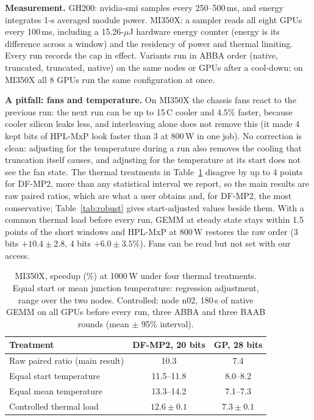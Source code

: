 \documentclass[conference]{IEEEtran}
\newcommand{\W}{\,W}
\newcommand{\pct}{\%}
\begin{document}
\textbf{Measurement.} GH200: nvidia-smi samples every 250--500\,ms, and energy integrates 1-s averaged module power.
MI350X: a sampler reads all eight GPUs every 100\,ms, including a 15.26-$\mu$J hardware energy counter (energy is its
difference across a window) and the residency of power and thermal limiting. Every run records the cap in effect.
Variants run in ABBA order (native, truncated, truncated, native) on the same nodes or GPUs after a cool-down; on MI350X all 8 GPUs run the same configuration
at once.

\textbf{A pitfall: fans and temperature.} On MI350X the chassis fans react to the previous run: the next run can be up
to 15\,\textdegree C cooler and 4.5\pct{} faster, because cooler silicon leaks less, and interleaving alone does not remove
this (it made 4 kept bits of HPL-MxP look faster than 3 at 800\W{} in one job). No correction is clean: adjusting for the
temperature during a run also removes the cooling that truncation itself causes, and adjusting for the temperature at
its start does not see the fan state. The thermal treatments in Table~\ref{tab:thermal} disagree by up to 4 points for
DF-MP2, more than any statistical interval we report, so the main results are raw paired ratios, which are what a user
obtains and, for DF-MP2, the most conservative; Table~\ref{tab:robust} gives start-adjusted values beside them. With a
common thermal load before every run, GEMM at steady state stays within 1.5 points of the short windows and HPL-MxP at
800\W{} restores the raw order (3 bits $+10.4\pm2.8$, 4 bits $+6.0\pm3.5\pct$). Fans can be read but not set with our
access.

\begin{table}[t]
\caption{MI350X, speedup (\%) at 1000\W{} under four thermal treatments. Equal start or mean junction temperature:
regression adjustment, range over the two nodes. Controlled: node n02, 180\,s of native GEMM on all GPUs before every
run, three ABBA and three BAAB rounds (mean $\pm$ 95\pct{} interval).}\label{tab:thermal}
\centering\footnotesize\setlength{\tabcolsep}{4pt}
\begin{tabular}{@{}lcc@{}}
\toprule
Treatment & DF-MP2, 20 bits & GP, 28 bits \\
\midrule
Raw paired ratio (main result) & 10.3 & 7.4 \\
Equal start temperature & 11.5--11.8 & 8.0--8.2 \\
Equal mean temperature & 13.3--14.2 & 7.1--7.3 \\
Controlled thermal load & $12.6\pm0.1$ & $7.3\pm0.1$ \\
\bottomrule
\end{tabular}
\end{table}
\end{document}
